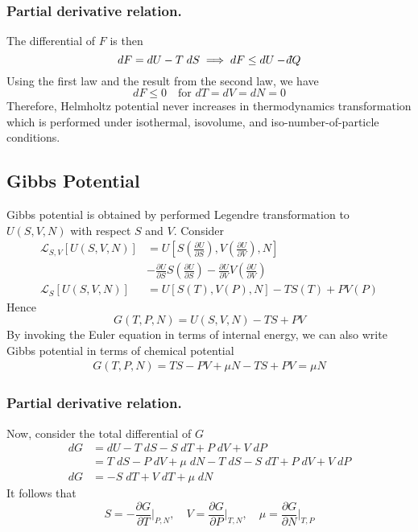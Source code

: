 \documentclass[../../../Main.tex]{subfiles}
\begin{document}
\subsubsection*{Partial derivative relation.} The differential of $F$ is then 
\begin{equation*}
    dF=dU-T\;dS\implies dF\leq dU-\dbar Q
\end{equation*}
Using the first law and the result from the second law, we have
\begin{equation*}
    dF\leq0\quad\text{for }dT=dV=dN=0
\end{equation*} 
Therefore, Helmholtz potential never increases in thermodynamics transformation which is performed under isothermal, isovolume, and iso-number-of-particle conditions.

\subsection*{Gibbs Potential}
Gibbs potential is obtained by performed Legendre transformation to $U(S,V,N)$ with respect $S$ and $V$. Consider
\begin{align*}
    \mathcal{L}_{S,V}[U(S,V,N)]&=U\left[S\left(\frac{\partial U}{\partial S}\right), V\left(\frac{\partial U}{\partial V}\right),N\right]\\
    &-\frac{\partial U}{\partial S}S\left(\frac{\partial U}{\partial S}\right) - \frac{\partial U}{\partial V}V\left(\frac{\partial U}{\partial V}\right)\\
    \mathcal{L}_S[U(S,V,N)]&=U[S(T),V(P),N]-TS(T)+PV(P)
\end{align*}
Hence
\begin{equation*}
    G(T,P,N)=U(S,V,N)-TS+PV
\end{equation*}
By invoking the Euler equation in terms of internal energy, we can also write Gibbs potential in terms of chemical potential 
\begin{align*}
    G(T,P,N)=TS-PV+\mu N-TS+PV=\mu N
\end{align*}
\subsubsection*{Partial derivative relation.} Now, consider the total differential of $G$
\begin{align*}
    dG&=dU-T\;dS-S\;dT+P\;dV+V\;dP\\
    &=T\;dS-P\;dV+\mu \;dN-T\;dS-S\;dT+P\;dV+V\;dP\\
    dG&=-S\;dT+V\;dT+\mu\;dN
\end{align*}
It follows that 
\begin{equation*}
    S=-\frac{\partial G}{\partial T}\bigg|_{P,N},\quad V=\frac{\partial G}{\partial P}\bigg|_{T,N},\quad \mu=\frac{\partial G}{\partial N}\bigg|_{T,P}
\end{equation*}
\end{document}
